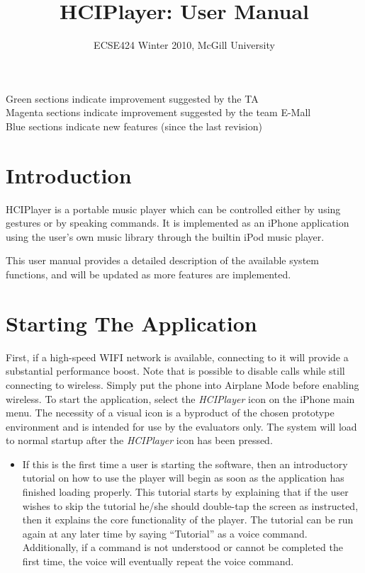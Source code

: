 \documentclass[12pt,letterpaper]{article}
\begin{document}
\title{HCIPlayer: User Manual}
\author{ECSE424 Winter 2010, McGill University}
\renewcommand{\today}{Updated: Tuesday, April 13th, 2010}
\maketitle

\begin{center}
{\color{OliveGreen} Green} sections indicate improvement suggested by the TA \\
{\color{magenta} Magenta} sections indicate improvement suggested by the team E-Mall \\
{\color{blue} Blue} sections indicate new features (since the last revision)
\end{center}

\section{Introduction}

HCIPlayer is a portable music player which can be controlled either by using gestures or by speaking commands. It is implemented as an iPhone application using the user's own music library through the builtin iPod music player.

This user manual provides a detailed description of the available system functions, and will be updated as more features are implemented.

\section{Starting The Application}

First, if a high-speed WIFI network is available, connecting to it will provide a substantial performance boost. {\color{blue} Note that is possible to disable calls while still connecting to wireless. Simply put the phone into Airplane Mode before enabling wireless.} To start the application, select the \emph{HCIPlayer} icon on the iPhone main menu. The necessity of a visual icon is a byproduct of the chosen prototype environment and is intended for use by the evaluators only. The system will load to normal startup after the \emph{HCIPlayer} icon has been pressed.

\begin{itemize}
\item If this is the first time a user is starting the software, then an introductory tutorial on how to use the player will begin as soon as the application has finished loading properly. This tutorial starts by explaining that if the user wishes to skip the tutorial he/she should double-tap the screen as instructed, then it explains the core functionality of the player. The tutorial can be run again at any later time by saying ``Tutorial'' as a voice command. {\color{blue} Additionally, if a command is not understood or cannot be completed the first time, the voice will eventually repeat the voice command.}
\end{itemize}
\end{document}
